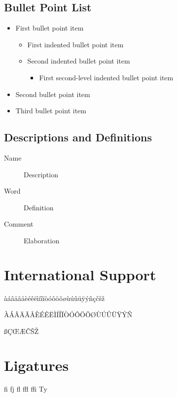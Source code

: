 \subsection{Bullet Point List}

\begin{itemize}
	\item First bullet point item
	\begin{itemize}
		\item First indented bullet point item
		\item Second indented bullet point item
		\begin{itemize}
			\item First second-level indented bullet point item
		\end{itemize}
	\end{itemize}
	\item Second bullet point item
	\item Third bullet point item
\end{itemize}

\subsection{Descriptions and Definitions}

\begin{description}
	\item[Name] Description
	\item[Word] Definition
	\item[Comment] Elaboration
\end{description}


\section{International Support}

àáâäãåèéêëìíîïòóôöõøùúûüÿýñçčšž

\noindent ÀÁÂÄÃÅÈÉÊËÌÍÎÏÒÓÔÖÕØÙÚÛÜŸÝÑ

\noindent ßÇŒÆČŠŽ


\section{Ligatures}

fi fj fl ffl ffi Ty

